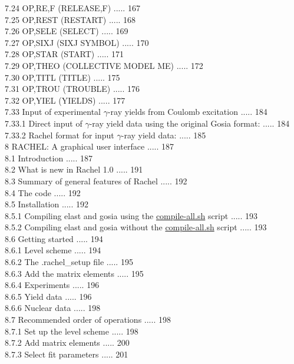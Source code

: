\documentclass[10pt]{article}
\begin{document}
7.24 OP,RE,F (RELEASE,F) ..... 167\\
7.25 OP,REST (RESTART) ..... 168\\
7.26 OP,SELE (SELECT) ..... 169\\
7.27 OP,SIXJ (SIXJ SYMBOL) ..... 170\\
7.28 OP,STAR (START) ..... 171\\
7.29 OP,THEO (COLLECTIVE MODEL ME) ..... 172\\
7.30 OP,TITL (TITLE) ..... 175\\
7.31 OP,TROU (TROUBLE) ..... 176\\
7.32 OP,YIEL (YIELDS) ..... 177\\
7.33 Input of experimental $\gamma$-ray yields from Coulomb excitation ..... 184\\
7.33.1 Direct input of $\gamma$-ray yield data using the original Gosia format: ..... 184\\
7.33.2 Rachel format for input $\gamma$-ray yield data: ..... 185\\
8 RACHEL: A graphical user interface ..... 187\\
8.1 Introduction ..... 187\\
8.2 What is new in Rachel 1.0 ..... 191\\
8.3 Summary of general features of Rachel ..... 192\\
8.4 The code ..... 192\\
8.5 Installation ..... 192\\
8.5.1 Compiling elast and gosia using the \href{http://compile-all.sh}{compile-all.sh} script ..... 193\\
8.5.2 Compiling elast and gosia without the \href{http://compile-all.sh}{compile-all.sh} script ..... 193\\
8.6 Getting started ..... 194\\
8.6.1 Level scheme ..... 194\\
8.6.2 The .rachel\_setup file ..... 195\\
8.6.3 Add the matrix elements ..... 195\\
8.6.4 Experiments ..... 196\\
8.6.5 Yield data ..... 196\\
8.6.6 Nuclear data ..... 198\\
8.7 Recommended order of operations ..... 198\\
8.7.1 Set up the level scheme ..... 198\\
8.7.2 Add matrix elements ..... 200\\
8.7.3 Select fit parameters ..... 201\\
\end{document}
